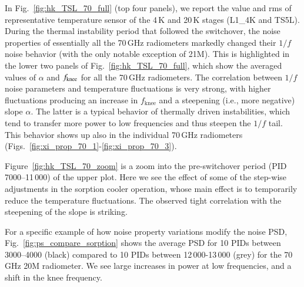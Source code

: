 \documentclass{aa}
\begin{document}
In Fig.~\ref{fig:hk_TSL_70_full} (top four panels), we report the value and rms of 
representative temperature sensor of the 4\,K and 20\,K stages 
(L1\_4K and TS5L). During the thermal instability period 
that followed the switchover, the noise
properties of essentially all the 70\,GHz radiometers markedly changed
their $1/f$ noise behavior (with the only notable exception of
21M). This is highlighted in the lower two panels of
Fig.~\ref{fig:hk_TSL_70_full}, which show the averaged values of $\alpha$ and
$f_{\rm knee}$ for all the 70\,GHz radiometers. The correlation between $1/f$ noise parameters and
temperature fluctuations is very strong, with higher fluctuations producing an
increase in $f_{\mathrm{knee}}$ and a steepening (i.e., more negative)
slope $\alpha$. The latter is a typical behavior of thermally driven
instabilities, which tend to transfer more power to low frequencies
and thus steepen the $1/f$ tail. This behavior shows up
also in the individual 70\,GHz radiometers
(Figs.~\ref{fig:xi_prop_70_1}-\ref{fig:xi_prop_70_3}).

Figure~\ref{fig:hk_TSL_70_zoom} is a zoom into the pre-switchover period
(PID 7000--11\,000) of the upper plot. Here we see the effect of some
of the step-wise adjustments in the sorption cooler operation, whose
main effect is to temporarily reduce the temperature fluctuations. The
observed tight correlation with the steepening of the slope is
striking.

For a specific example of how noise property variations modify the
noise PSD, Fig.~\ref{fig:ps_compare_sorption} shows the average PSD
for 10 PIDs between 3000--4000 (black) compared to 10 PIDs between
12\,000-13\,000 (grey) for the 70\,GHz 20M radiometer. We see large
increases in power at low frequencies, and a shift in the knee
frequency.
\end{document}
